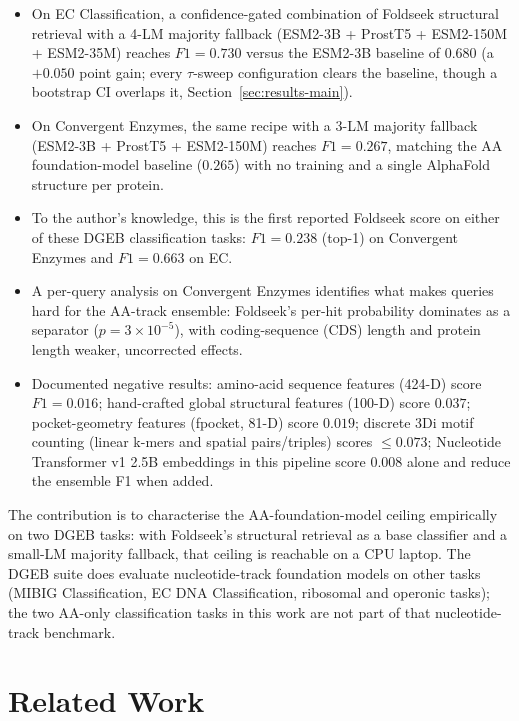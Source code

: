 \documentclass[11pt,letterpaper]{article}
\begin{document}
\begin{itemize}
\item On EC Classification, a confidence-gated combination of Foldseek
      structural retrieval with a 4-LM majority fallback
      (ESM2-3B + ProstT5 + ESM2-150M + ESM2-35M) reaches $F1 = 0.730$
      versus the ESM2-3B baseline of $0.680$ (a $+0.050$ point gain;
      every $\tau$-sweep configuration clears the baseline, though a
      bootstrap CI overlaps it, Section~\ref{sec:results-main}).
\item On Convergent Enzymes, the same recipe with a 3-LM majority
      fallback (ESM2-3B + ProstT5 + ESM2-150M) reaches $F1 = 0.267$,
      matching the AA foundation-model baseline ($0.265$) with no
      training and a single AlphaFold structure per protein.
\item To the author's knowledge, this is the first reported Foldseek
      score on either of these DGEB classification tasks: $F1 = 0.238$
      (top-1) on Convergent Enzymes and $F1 = 0.663$ on EC.
\item A per-query analysis on Convergent Enzymes identifies what makes
      queries hard for the AA-track ensemble: Foldseek's per-hit
      probability dominates as a separator ($p = 3 \times 10^{-5}$),
      with coding-sequence (CDS) length and protein length weaker,
      uncorrected effects.
\item Documented negative results: amino-acid sequence features
      (424-D) score $F1 = 0.016$; hand-crafted global structural
      features (100-D) score $0.037$; pocket-geometry features
      (fpocket, 81-D) score $0.019$; discrete 3Di motif counting
      (linear k-mers and spatial pairs/triples) scores
      $\leq 0.073$; Nucleotide Transformer v1 2.5B embeddings in this
      pipeline score $0.008$ alone and reduce the ensemble F1 when
      added.
\end{itemize}

The contribution is to characterise the AA-foundation-model ceiling
empirically on two DGEB tasks: with Foldseek's structural retrieval as
a base classifier and a small-LM majority fallback, that ceiling is
reachable on a CPU laptop. The DGEB suite does evaluate nucleotide-track
foundation models on other tasks (MIBIG Classification, EC DNA
Classification, ribosomal and operonic tasks); the two AA-only
classification tasks in this work are not part of that nucleotide-track
benchmark.

\section{Related Work}
\end{document}
